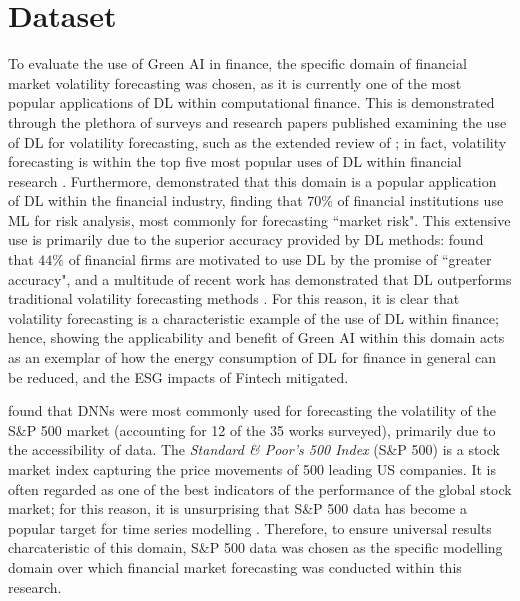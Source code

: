 \documentclass[a4paper, 11pt]{report}
\begin{document}
    \section{Dataset}
    \label{section: dataset}

    To evaluate the use of Green AI in finance, the specific domain of financial market volatility forecasting was chosen, as it is currently one of the most popular applications of DL within computational finance. This is demonstrated through the plethora of surveys and research papers published examining the use of DL for volatility forecasting, such as the extended review of \citet{ge-2022}; in fact, volatility forecasting is within the top five most popular uses of DL within financial research \citep{sezer-2019}. Furthermore, \citet{chartis-2019} demonstrated that this domain is a popular application of DL within the financial industry, finding that $70\%$ of financial institutions use ML for risk analysis, most commonly for forecasting ``market risk". This extensive use is primarily due to the superior accuracy provided by DL methods: \citet{chartis-2019} found that $44\%$ of financial firms are motivated to use DL by the promise of ``greater accuracy", and a multitude of recent work has demonstrated that DL outperforms traditional volatility forecasting methods \citep{rodikov-2022}. For this reason, it is clear that volatility forecasting is a characteristic example of the use of DL within finance; hence, showing the applicability and benefit of Green AI within this domain acts as an exemplar of how the energy consumption of DL for finance in general can be reduced, and the ESG impacts of Fintech mitigated.


    \citet{ge-2022} found that DNNs were most commonly used for forecasting the volatility of the S\&P 500 market (accounting for 12 of the 35 works surveyed), primarily due to the accessibility of data. The \emph{Standard \& Poor's 500 Index} (S\&P 500) is a stock market index capturing the price movements of 500 leading US companies. It is often regarded as one of the best indicators of the performance of the global stock market; for this reason, it is unsurprising that S\&P 500 data has become a popular target for time series modelling \citep{thakkar-2021}. Therefore, to ensure universal results charcateristic of this domain, S\&P 500 data was chosen as the specific modelling domain over which financial market forecasting was conducted within this research.
\end{document}
